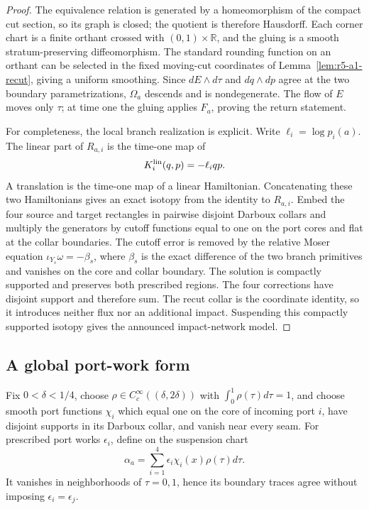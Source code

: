 \begin{proof}
The equivalence relation is generated by a homeomorphism of the compact cut
section, so its graph is closed; the quotient is therefore Hausdorff.  Each
corner chart is a finite orthant crossed with \((0,1)\times\mathbb R\), and
the gluing is a smooth stratum-preserving diffeomorphism.  The standard
rounding function on an orthant can be selected in the fixed moving-cut
coordinates of Lemma~\ref{lem:r5-a1-recut}, giving a uniform smoothing.
Since \(dE\wedge d\tau\) and \(dq\wedge dp\) agree at the two boundary
parametrizations, \(\Omega_a\) descends and is nondegenerate.  The flow of
\(E\) moves only \(\tau\); at time one the gluing applies \(F_a\), proving the
return statement.

For completeness, the local branch realization is explicit.  Write
\(\ell_i=\log p_i(a)\).  The linear part of \(R_{a,i}\) is the time-one map of
\[
 K_{i}^{\rm lin}(q,p)=-\ell_i qp.
\]
A translation is the time-one map of a linear Hamiltonian.  Concatenating
these two Hamiltonians gives an exact isotopy from the identity to
\(R_{a,i}\).  Embed the four source and target rectangles in pairwise disjoint
Darboux collars and multiply the generators by cutoff functions equal to one
on the port cores and flat at the collar boundaries.  The cutoff error is
removed by the relative Moser equation
\(\iota_{Y_s}\omega=-\beta_s\), where \(\beta_s\) is the exact difference of
the two branch primitives and vanishes on the core and collar boundary.
The solution is compactly supported and preserves both prescribed regions.
The four corrections have disjoint support and therefore sum.  The recut
collar is the coordinate identity, so it introduces neither flux nor an
additional impact.  Suspending this compactly supported isotopy gives the
announced impact-network model.
\end{proof}

\subsection{A global port-work form}

Fix \(0<\delta<1/4\), choose
\(\rho\in C_c^\infty((\delta,2\delta))\) with
\(\int_0^1\rho(\tau)d\tau=1\), and choose smooth port functions
\(\chi_i\) which equal one on the core of incoming port \(i\), have disjoint
supports in its Darboux collar, and vanish near every seam.  For prescribed
port works \(\epsilon_i\), define on the suspension chart
\[
 \alpha_a=\sum_{i=1}^4\epsilon_i\chi_i(x)\rho(\tau)d\tau.
\]
It vanishes in neighborhoods of \(\tau=0,1\), hence its boundary traces agree
without imposing \(\epsilon_i=\epsilon_j\).

